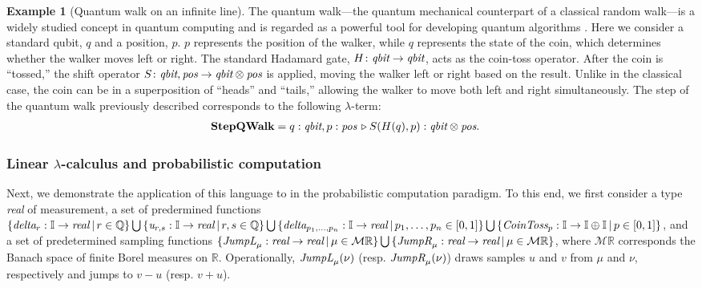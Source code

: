 \documentclass[10pt,a4paper]{amsart}
\theoremstyle{definition}
\theoremstyle{definition}
\newtheorem{example}[definition]{Example}
\theoremstyle{definition}
\theoremstyle{definition}
\theoremstyle{definition}
\theoremstyle{definition}
\begin{document}
\begin{example} [Quantum walk on an infinite line]
  The quantum walk—the quantum mechanical counterpart of a classical random walk—is a widely studied concept in quantum computing and is regarded as a powerful tool for developing quantum algorithms \cite{venegasQuantumWalksComprehensive2012}. Here we consider a standard qubit, $q$ and a position, $p$. $p$ represents the position of the walker, while $q$ represents the state of the coin, which determines whether the walker moves left or right. The standard Hadamard gate, $H\colon \emph{qbit} \to \emph{qbit}$, acts as the coin-toss operator. After the coin is ``tossed,'' the shift operator $S\colon \emph{qbit}, \emph{pos}  \to \emph{qbit} \otimes \emph{pos}$ is applied, moving the walker left or right based on the result. Unlike in the classical case, the coin can be in a superposition of ``heads'' and ``tails,'' allowing the walker to move both left and right simultaneously. The step of the quantum walk previously described corresponds to the following $\lambda$-term:
  \begin{align*}
  &\textbf{StepQWalk} = q: \emph{qbit}, p: \emph{pos} \, \triangleright  S(H(q), p) : \emph{qbit} \otimes \emph{pos}.
\end{align*}

\end{example}


\subsubsection{Linear $\lambda$-calculus and probabilistic computation} \label{subsec:syntax_pc}
Next, we demonstrate the application of this language to in the probabilistic computation paradigm. To this end, we first consider a type \emph{real} of measurement, a set of predermined functions 
$\{\emph{delta}_r: \mathbb{I} \to \emph{real} \hspace{2pt} \vert \, r \in \mathbb{Q} \} 
\bigcup \, \{ \emph{u}_{r,s}: \mathbb{I} \to \emph{real} \hspace{2pt} \vert \, r,s \in \mathbb{Q} \}
\bigcup \, \{ \emph{delta}_{p_1,\ldots,p_n}: \mathbb{I} \to \emph{real} \hspace{2pt} \vert \, p_1,\ldots,p_n  \in [0,1] \}  
\bigcup \, \{\emph{CoinToss}_p: \mathbb{I} \to \mathbb{I} \oplus \mathbb{I} \hspace{2pt} \vert \, p \in [0,1] \} $,  
and a set of predetermined sampling functions 
$ \{\emph{JumpL}_\mu: \emph{real}  \to \emph{real} \hspace{2pt} \vert \, \mu \in \mathcal{M}\mathbb{R} \} 
\bigcup \, \{\emph{JumpR}_\mu: \emph{real}  \to \emph{real} \hspace{2pt} \vert \, \mu \in \mathcal{M}\mathbb{R} \}$, where $\mathcal{M}\mathbb{R}$ corresponds the Banach space of finite Borel measures on $\mathbb{R}$.  Operationally, $\emph{JumpL}_\mu (\nu)$ (resp. $\emph{JumpR}_\mu (\nu)$) draws samples $u$ and $v$ from $\mu$ and $\nu$, respectively and jumps to $v-u$ (resp. $v+u$).
\end{document}
